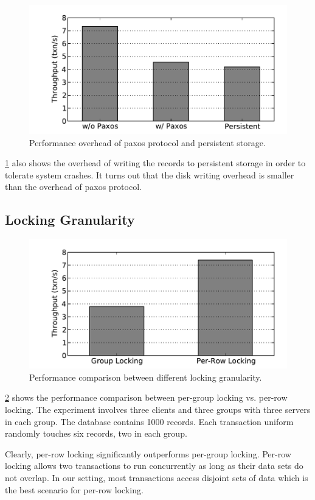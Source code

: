 \documentclass{vldb}
\begin{document}
\begin{figure}[t!]
	\centering
	\includegraphics[width=0.6\columnwidth]{figs/paxos_persistent.pdf}
	\caption{
		Performance overhead of paxos protocol and persistent storage.
	}
	\label{fig:paxos-persistent}
\end{figure}

\cref{fig:paxos-persistent} also shows the overhead of writing the 
records to persistent storage in order to tolerate system crashes. It 
turns out that the disk writing overhead is smaller than the overhead 
of paxos protocol. 

\subsection{Locking Granularity}

\begin{figure}[t!]
	\centering
	\includegraphics[width=0.6\columnwidth]{figs/locking_granularity.pdf}
	\caption{
		Performance comparison between different locking granularity.
	}
	\label{fig:locking-granularity}
\end{figure}

\cref{fig:locking-granularity} shows the performance comparison 
between per-group locking vs. per-row locking. The experiment involves 
three clients and three groups with three servers in each group. The 
database contains 1000 records. Each transaction uniform randomly 
touches six records, two in each group. 

Clearly, per-row locking significantly outperforms per-group locking.  
Per-row locking allows two transactions to run concurrently as long as 
their data sets do not overlap. In our setting, most transactions 
access disjoint sets of data which is the best scenario for per-row 
locking. 
\end{document}
